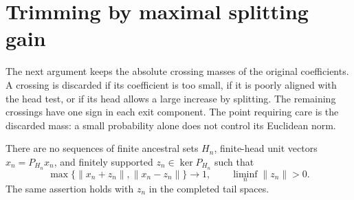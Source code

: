 \section{Trimming by maximal splitting gain}\label{stab:trim:section}

The next argument keeps the absolute crossing masses of the original
coefficients. A crossing is discarded if its coefficient is too
small, if it is poorly aligned with the head test, or if its head
allows a large increase by splitting. The remaining crossings have
one sign in each exit component. The point requiring care is the
discarded mass: a small probability alone does not control its
Euclidean norm.

\begin{proposition}\label{stab:trim:vanishing-lens}
There are no sequences of finite ancestral sets $H_n$, finite-head
unit vectors $x_n=P_{H_n}x_n$, and finitely supported
$z_n\in\ker P_{H_n}$ such that
\[
 \max\{\|x_n+z_n\|,\|x_n-z_n\|\}\longrightarrow1,
 \qquad \liminf_n\|z_n\|>0.
\]
The same assertion holds with $z_n$ in the completed tail spaces.
\end{proposition}

